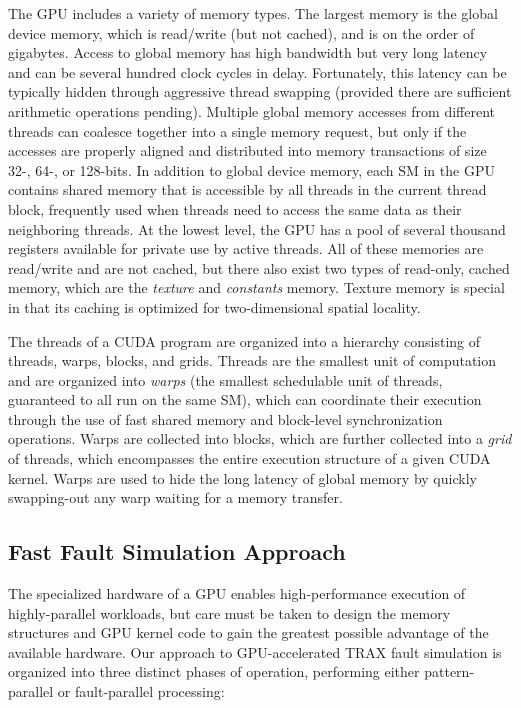 The GPU includes a variety of memory types.
%
The largest memory is the global device memory, which is read/write (but not cached), and is on the order of gigabytes.
%
Access to global memory has high bandwidth but very long latency and can be several hundred clock cycles in delay.
%
Fortunately, this latency can be typically hidden through aggressive thread swapping (provided there are sufficient arithmetic operations pending).
%
Multiple global memory accesses from different threads can coalesce together into a single memory request, but only if the accesses are properly aligned and distributed into memory transactions of size 32-, 64-, or 128-bits.
%
In addition to global device memory, each SM in the GPU contains shared memory that is accessible by all threads in the current thread block, frequently used when threads need to access the same data as their neighboring threads.
%
At the lowest level, the GPU has a pool of several thousand registers available for private use by active threads.
%
All of these memories are read/write and are not cached, but there also exist two types of read-only, cached memory, which are the \textit{texture} and \textit{constants} memory.
%
Texture memory is special in that its caching is optimized for two-dimensional spatial locality.

The threads of a CUDA program are organized into a hierarchy consisting of threads, warps, blocks, and grids.
%
Threads are the smallest unit of computation and are organized into \textit{warps} (the smallest schedulable unit of threads, guaranteed to all run on the same SM), which can coordinate their execution through the use of fast shared memory and block-level synchronization operations.
%
Warps are collected into blocks, which are further collected into a \textit{grid} of threads, which encompasses the entire execution structure of a given CUDA kernel.
%
Warps are used to hide the long latency of global memory by quickly swapping-out any warp waiting for a memory transfer.

\subsection{Fast Fault Simulation Approach}
\label{sec:trax_gpu_approach}
The specialized hardware of a GPU enables high-performance execution of highly-parallel workloads, but care must be taken to design the memory structures and GPU kernel code to gain the greatest possible advantage of the available hardware.
%
Our approach to GPU-accelerated TRAX fault simulation is organized into three distinct phases of operation, performing either pattern-parallel or fault-parallel processing:

